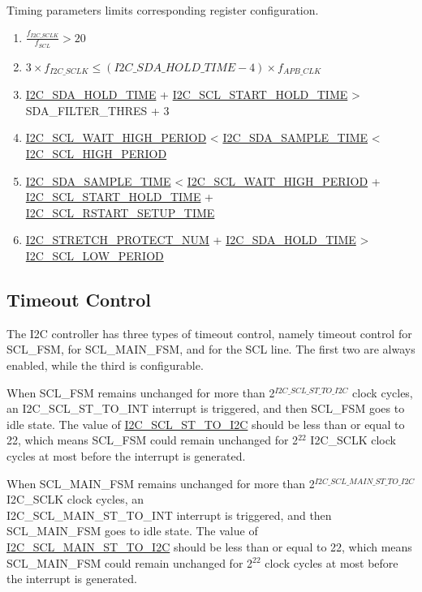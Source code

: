 \documentclass[main\_\_EN.tex]{subfiles}
\begin{document}
Timing parameters limits corresponding register configuration.
\begin{enumerate}
\item $\frac{f_{I2C\_SCLK}}{f_{SCL}}  > 20$
\item $3 \times f_{I2C\_SCLK} \leq (\hyperref[fielddesc:I2CSDAHOLDTIME]{I2C\_SDA\_HOLD\_TIME}-4) \times f_{APB\_CLK}$
\item \hyperref[fielddesc:I2CSDAHOLDTIME]{I2C\_SDA\_HOLD\_TIME} + \hyperref[fielddesc:I2CSCLSTARTHOLDTIME]{I2C\_SCL\_START\_HOLD\_TIME} > SDA\_FILTER\_THRES + 3
\item \hyperref[fielddesc:I2CSCLWAITHIGHPERIOD]{I2C\_SCL\_WAIT\_HIGH\_PERIOD} < \hyperref[fielddesc:I2CSDASAMPLETIME]{I2C\_SDA\_SAMPLE\_TIME} < \hyperref[fielddesc:I2CSCLHIGHPERIOD]{I2C\_SCL\_HIGH\_PERIOD}
\item \hyperref[fielddesc:I2CSDASAMPLETIME]{I2C\_SDA\_SAMPLE\_TIME} < \hyperref[fielddesc:I2CSCLWAITHIGHPERIOD]{I2C\_SCL\_WAIT\_HIGH\_PERIOD} + \hyperref[fielddesc:I2CSCLSTARTHOLDTIME]{I2C\_SCL\_START\_HOLD\_TIME} + \\\hyperref[fielddesc:I2CSCLRSTARTSETUPTIME]{I2C\_SCL\_RSTART\_SETUP\_TIME}
\item \hyperref[fielddesc:I2CSTRETCHPROTECTNUM]{I2C\_STRETCH\_PROTECT\_NUM} + \hyperref[fielddesc:I2CSDAHOLDTIME]{I2C\_SDA\_HOLD\_TIME} > \hyperref[fielddesc:I2CSCLLOWPERIOD]{I2C\_SCL\_LOW\_PERIOD}
\end{enumerate}

\subsection{Timeout Control}
The I2C controller has three types of timeout control, namely timeout control for SCL\_FSM, for SCL\_MAIN\_FSM, and for the SCL line. The first two are always enabled, while the third is configurable.

When SCL\_FSM remains unchanged for more than 2$^{\hyperref[fielddesc:I2CSCLSTTOI2C]{I2C\_SCL\_ST\_TO\_I2C}}$  clock cycles, an I2C\_SCL\_ST\_TO\_INT interrupt is triggered, and then SCL\_FSM goes to idle state. The value of \hyperref[fielddesc:I2CSCLSTTOI2C]{I2C\_SCL\_ST\_TO\_I2C} should be less than or equal to 22, which means SCL\_FSM could remain unchanged for 2$^{22}$ I2C\_SCLK clock cycles at most before the interrupt is generated.

When SCL\_MAIN\_FSM remains unchanged for more than 2$^{ \hyperref[fielddesc:I2CSCLMAINSTTOI2C]{I2C\_SCL\_MAIN\_ST\_TO\_I2C} }$ I2C\_SCLK clock cycles, an \\I2C\_SCL\_MAIN\_ST\_TO\_INT interrupt is triggered, and then SCL\_MAIN\_FSM goes to idle state. The value of \hyperref[fielddesc:I2CSCLMAINSTTOI2C]{I2C\_SCL\_MAIN\_ST\_TO\_I2C} should be less than or equal to 22, which means SCL\_MAIN\_FSM could remain unchanged for 2$^{22}$ clock cycles at most before the interrupt is generated.
\end{document}
